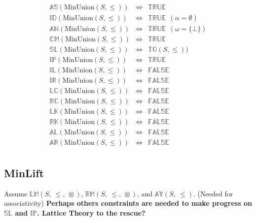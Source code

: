 \documentclass[10pt]{article}
\newcommand{\propname}[1]{{\mathbb{#1}}}
\begin{document}
\[
\begin{array}{rcl} 
\propname{AS}(\mathrm{MinUnion}(S, \leq)) 
  & \Leftrightarrow 
  & \propname{TRUE}
  \\ 
\propname{ID}(\mathrm{MinUnion}(S, \leq)) 
  & \Leftrightarrow 
  & \propname{TRUE} \ \ (\alpha = \emptyset)
  \\ 
\propname{AN}(\mathrm{MinUnion}(S, \leq)) 
  & \Leftrightarrow 
  & \propname{TRUE} \ \ (\omega = \{\bot\})
  \\
\propname{CM}(\mathrm{MinUnion}(S, \leq)) 
  & \Leftrightarrow 
  & \propname{TRUE}
  \\ 
\propname{SL}(\mathrm{MinUnion}(S, \leq)) 
  & \Leftrightarrow 
  & \propname{TO}(S, \leq))  
  \\ 
\propname{IP}(\mathrm{MinUnion}(S, \leq)) 
  & \Leftrightarrow 
  & \propname{TRUE}
  \\ 
\propname{IL}(\mathrm{MinUnion}(S, \leq)) 
  & \Leftrightarrow 
  & \propname{FALSE}
  \\ 
\propname{IR}(\mathrm{MinUnion}(S, \leq)) 
  & \Leftrightarrow 
  & \propname{FALSE}
  \\ 
\propname{LC}(\mathrm{MinUnion}(S, \leq)) 
  & \Leftrightarrow 
  & \propname{FALSE}
  \\ 
\propname{RC}(\mathrm{MinUnion}(S, \leq)) 
  & \Leftrightarrow 
  & \propname{FALSE} 
  \\ 
\propname{LK}(\mathrm{MinUnion}(S, \leq)) 
  & \Leftrightarrow 
  & \propname{FALSE} 
  \\ 
\propname{RK}(\mathrm{MinUnion}(S, \leq)) 
  & \Leftrightarrow 
  & \propname{FALSE}
  \\ 
\propname{AL}(\mathrm{MinUnion}(S, \leq))  
  & \Leftrightarrow 
  & \propname{FALSE} 
  \\ 
\propname{AR}(\mathrm{MinUnion}(S, \leq))  
  & \Leftrightarrow 
  & \propname{FALSE} 
  \\ 
\end{array} 
\] 

\subsection{MinLift} 

Assume 
$\propname{LM}(S,\ \leq,\ \otimes)$, 
$\propname{RM}(S,\ \leq,\ \otimes)$, 
and 
$\propname{AY}(S,\ \leq)$. 
(Needed for associativity) 
{\bf Perhaps others constraints are needed to make progress on 
$\propname{SL}$ and $\propname{IP}$. 
Lattice Theory to the rescue?
}

\end{document}

